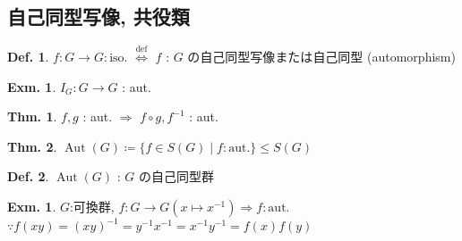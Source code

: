 \documentclass[uplatex,dvipdfmx,9pt]{beamer}
\newcommand{\defarrow}{\overset{\mathrm{def}}{\Leftrightarrow}}
\newcommand{\inverse}[1]{#1^{-1}}
\newcommand{\Aut}{\operatorname{Aut}}
\newcounter{textExmCount}
\theoremstyle{definition} %
\newtheorem{defn}{Def.}[subsection] %
\newtheorem{thm}{Thm.}[subsection] %
\theoremstyle{example}
\newtheorem{exm}{Exm.}[subsection]
\newtheorem{exmText}[textExmCount]{Exm.}
\begin{document}
    \subsection{\textsection \thesubsection 自己同型写像, 共役類}
    \setcounter{textExmCount}{0}

      \begin{frame}
        
        \begin{defn}
          $f\colon G \to G: \text{iso.}$ $\defarrow$ $f$ : $G$ の\alert{自己同型写像}または\alert{自己同型} (automorphism) 
        \end{defn}

        \begin{exm}
          $I_G\colon G \to G$ : aut.
        \end{exm}

        \begin{thm}
          $f, g$ : aut. $\Rightarrow$ $f \circ g, \inverse{f}$ : aut. 
        \end{thm}

        \begin{thm}
          $\Aut(G) \coloneqq \{ f \in S(G) \mid f: \text{aut.} \} \le S(G)$
        \end{thm}

        \begin{defn}
          $\Aut(G)$ : $G$ の\alert{自己同型群}
        \end{defn}

        \begin{exmText}
          $G$:可換群, $f\colon G \to G (x \mapsto \inverse{x}) \Rightarrow f: \text{aut.}$ \\
          $\because f(xy) = \inverse{(xy)} = \inverse{y}\inverse{x} = \inverse{x}\inverse{y} = f(x)f(y)$
        \end{exmText}
        
      \end{frame}
\end{document}
